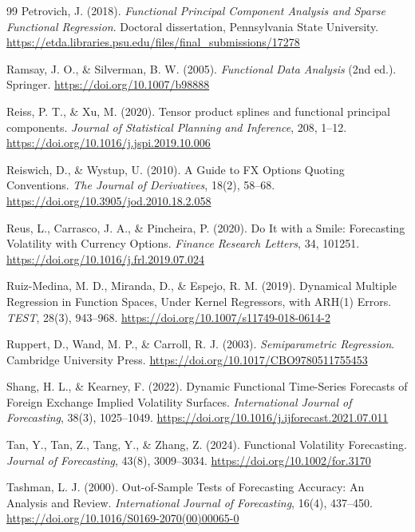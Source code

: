 \documentclass[a4paper,11pt]{article}
\begin{document}
\begin{thebibliography}{99}
Petrovich, J. (2018). \emph{Functional Principal Component Analysis and Sparse Functional Regression}. Doctoral dissertation, Pennsylvania State University. \url{https://etda.libraries.psu.edu/files/final_submissions/17278}

Ramsay, J. O., \& Silverman, B. W. (2005). \emph{Functional Data Analysis} (2nd ed.). Springer. \url{https://doi.org/10.1007/b98888}

Reiss, P. T., \& Xu, M. (2020). Tensor product splines and functional principal components. \emph{Journal of Statistical Planning and Inference}, 208, 1--12. \url{https://doi.org/10.1016/j.jspi.2019.10.006}

Reiswich, D., \& Wystup, U. (2010). A Guide to FX Options Quoting Conventions. \emph{The Journal of Derivatives}, 18(2), 58--68. \url{https://doi.org/10.3905/jod.2010.18.2.058}

Reus, L., Carrasco, J. A., \& Pincheira, P. (2020). Do It with a Smile: Forecasting Volatility with Currency Options. \emph{Finance Research Letters}, 34, 101251. \url{https://doi.org/10.1016/j.frl.2019.07.024}

Ruiz-Medina, M. D., Miranda, D., \& Espejo, R. M. (2019). Dynamical Multiple Regression in Function Spaces, Under Kernel Regressors, with ARH(1) Errors. \emph{TEST}, 28(3), 943--968. \url{https://doi.org/10.1007/s11749-018-0614-2}

Ruppert, D., Wand, M. P., \& Carroll, R. J. (2003). \emph{Semiparametric Regression}. Cambridge University Press. \url{https://doi.org/10.1017/CBO9780511755453}

Shang, H. L., \& Kearney, F. (2022). Dynamic Functional Time-Series Forecasts of Foreign Exchange Implied Volatility Surfaces. \emph{International Journal of Forecasting}, 38(3), 1025--1049. \url{https://doi.org/10.1016/j.ijforecast.2021.07.011}

Tan, Y., Tan, Z., Tang, Y., \& Zhang, Z. (2024). Functional Volatility Forecasting. \emph{Journal of Forecasting}, 43(8), 3009--3034. \url{https://doi.org/10.1002/for.3170}

Tashman, L. J. (2000). Out-of-Sample Tests of Forecasting Accuracy: An Analysis and Review. \emph{International Journal of Forecasting}, 16(4), 437--450. \url{https://doi.org/10.1016/S0169-2070(00)00065-0}


\end{thebibliography}
\end{document}
